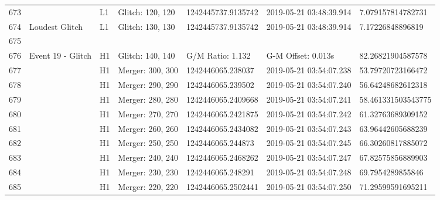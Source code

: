 \begin{longtable}{lllllll}
673  &                                                    &       L1 &  Glitch: 120, 120 &  1242445737.9135742 &  2019-05-21 03:48:39.914 &   7.079157814782731 \\
674  &                                     Loudest Glitch &       L1 &  Glitch: 130, 130 &  1242445737.9135742 &  2019-05-21 03:48:39.914 &    7.17226848896819 \\
675  &                                                    &          &                   &                     &                          &                     \\
676  &                                  Event 19 - Glitch &       H1 &  Glitch: 140, 140 &    G/M Ratio: 1.132 &       G-M Offset: 0.013s &   82.26821904587578 \\
677  &                                                    &       H1 &  Merger: 300, 300 &   1242446065.238037 &  2019-05-21 03:54:07.238 &   53.79720723166472 \\
678  &                                                    &       H1 &  Merger: 290, 290 &   1242446065.239502 &  2019-05-21 03:54:07.240 &   56.64248682612318 \\
679  &                                                    &       H1 &  Merger: 280, 280 &  1242446065.2409668 &  2019-05-21 03:54:07.241 &  58.461331503543775 \\
680  &                                                    &       H1 &  Merger: 270, 270 &  1242446065.2421875 &  2019-05-21 03:54:07.242 &   61.32763689309152 \\
681  &                                                    &       H1 &  Merger: 260, 260 &  1242446065.2434082 &  2019-05-21 03:54:07.243 &   63.96442605688239 \\
682  &                                                    &       H1 &  Merger: 250, 250 &   1242446065.244873 &  2019-05-21 03:54:07.245 &   66.30260817885072 \\
683  &                                                    &       H1 &  Merger: 240, 240 &  1242446065.2468262 &  2019-05-21 03:54:07.247 &   67.82575856889903 \\
684  &                                                    &       H1 &  Merger: 230, 230 &   1242446065.248291 &  2019-05-21 03:54:07.248 &    69.7954289855846 \\
685  &                                                    &       H1 &  Merger: 220, 220 &  1242446065.2502441 &  2019-05-21 03:54:07.250 &   71.29599591695211 \\

\end{longtable}
